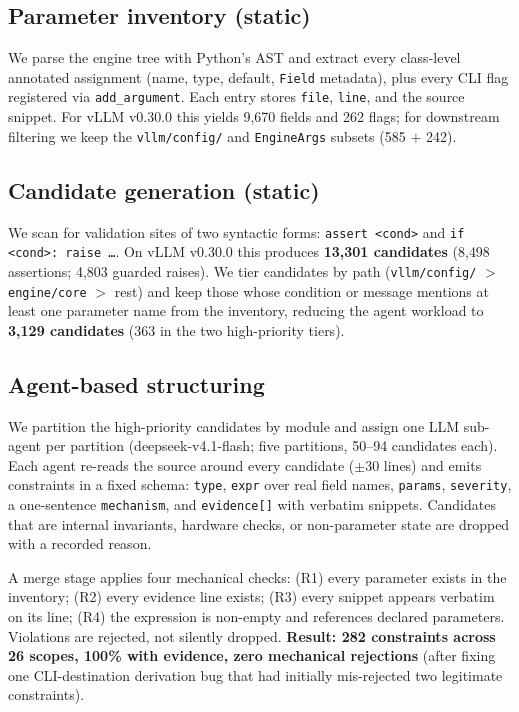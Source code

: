 \documentclass[journal]{IEEEtran}
\newcommand{\code}[1]{\texttt{#1}}
\begin{document}
\subsection{Parameter inventory (static)}

We parse the engine tree with Python's AST and extract every class-level annotated assignment (name, type, default, \code{Field} metadata), plus every CLI flag registered via \code{add\_argument}. Each entry stores \code{file}, \code{line}, and the source snippet. For vLLM v0.30.0 this yields 9{,}670 fields and 262 flags; for downstream filtering we keep the \code{vllm/config/} and \code{EngineArgs} subsets (585 $+$ 242).

\subsection{Candidate generation (static)}

We scan for validation sites of two syntactic forms: \code{assert <cond>} and \code{if <cond>: raise \ldots}. On vLLM v0.30.0 this produces \textbf{13{,}301 candidates} (8{,}498 assertions; 4{,}803 guarded raises). We tier candidates by path (\code{vllm/config/} $>$ \code{engine/core} $>$ rest) and keep those whose condition or message mentions at least one parameter name from the inventory, reducing the agent workload to \textbf{3{,}129 candidates} (363 in the two high-priority tiers).

\subsection{Agent-based structuring}
\label{sec:agent}

We partition the high-priority candidates by module and assign one LLM sub-agent per partition (deepseek-v4.1-flash; five partitions, 50--94 candidates each). Each agent re-reads the source around every candidate ($\pm$30 lines) and emits constraints in a fixed schema: \code{type}, \code{expr} over real field names, \code{params}, \code{severity}, a one-sentence \code{mechanism}, and \code{evidence[]} with verbatim snippets. Candidates that are internal invariants, hardware checks, or non-parameter state are dropped with a recorded reason.

A merge stage applies four mechanical checks: (R1) every parameter exists in the inventory; (R2) every evidence line exists; (R3) every snippet appears verbatim on its line; (R4) the expression is non-empty and references declared parameters. Violations are rejected, not silently dropped. \textbf{Result: 282 constraints across 26 scopes, 100\% with evidence, zero mechanical rejections} (after fixing one CLI-destination derivation bug that had initially mis-rejected two legitimate constraints).
\end{document}
